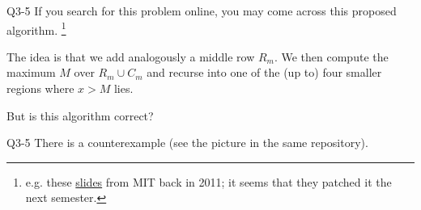 \documentclass[t]{beamer}
\begin{document}
\begin{frame}{Q3-5}
  If you search for this problem online, you may come across this proposed algorithm. \footnote{e.g. these  \href{https://courses.csail.mit.edu/6.006/spring11/lectures/lec02.pdf}{slides} from MIT back in 2011; it seems that they patched it the next semester. }
  \par The idea is that we add analogously a middle row $R_m$. We then compute the maximum $M$ over $R_m \cup C_m$ and recurse into one of the (up to) four smaller regions where $x>M$ lies. 
  \begin{center}
  \end{center}
  But is this algorithm correct? 
\end{frame}
\begin{frame}{Q3-5}
  There is a counterexample (see the picture in the same repository). 
\end{frame}
\iffalse
\end{document}
